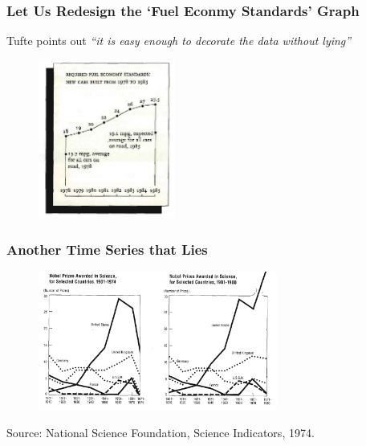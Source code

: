 \documentclass[aspectratio=1610]{beamer}
\begin{document}
\begin{frame}
	\frametitle{Let Us Redesign the `Fuel Econmy Standards' Graph}

	Tufte points out \emph{``it is easy enough to decorate the data
		without lying''}
	\begin{figure}
		\begin{small}
			\begin{center}
				\includegraphics[width=0.4\textwidth]{
					images/redo_fuel_economy.png
				}
			\end{center}
		\end{small}
	\end{figure}

\end{frame}

\begin{frame}
	\frametitle{Another Time Series that Lies}
	\begin{figure}
		\begin{small}
			\begin{center}
				\includegraphics[width=0.7\textwidth]{
					images/nsf.png
				}
			\end{center}
		\end{small}
	\end{figure}

	\footnotesize
	Source: National Science Foundation, Science Indicators, 1974.

\end{frame}
\end{document}
